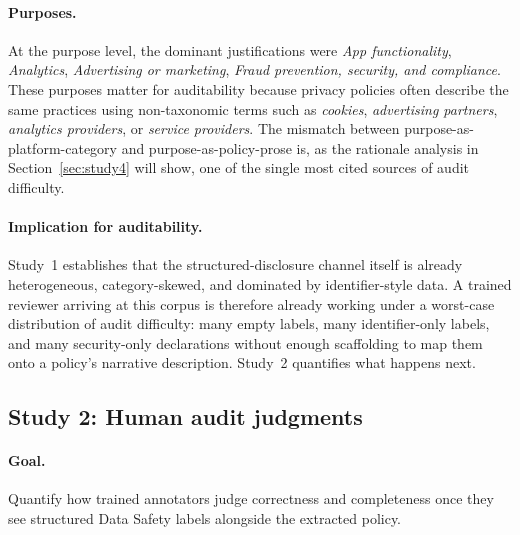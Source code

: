 \documentclass[11pt,a4paper]{article}
\begin{document}
\paragraph{Purposes.}
At the purpose level, the dominant justifications were
\emph{App functionality}, \emph{Analytics}, \emph{Advertising or
marketing}, \emph{Fraud prevention, security, and compliance}. These
purposes matter for auditability because privacy policies often
describe the same practices using non-taxonomic terms such as
\emph{cookies}, \emph{advertising partners}, \emph{analytics
providers}, or \emph{service providers}. The mismatch between
purpose-as-platform-category and purpose-as-policy-prose is, as the
rationale analysis in Section~\ref{sec:study4} will show, one of the
single most cited sources of audit difficulty.

\paragraph{Implication for auditability.}
Study~1 establishes that the structured-disclosure channel itself is
already heterogeneous, category-skewed, and dominated by identifier-style
data. A trained reviewer arriving at this corpus is therefore already
working under a worst-case distribution of audit difficulty: many empty
labels, many identifier-only labels, and many security-only declarations
without enough scaffolding to map them onto a policy's narrative
description. Study~2 quantifies what happens next.

\subsection{Study 2: Human audit judgments}
\label{sec:study2}
\paragraph{Goal.} Quantify how trained annotators judge correctness and
completeness once they see structured Data Safety labels alongside the
extracted policy.
\end{document}
